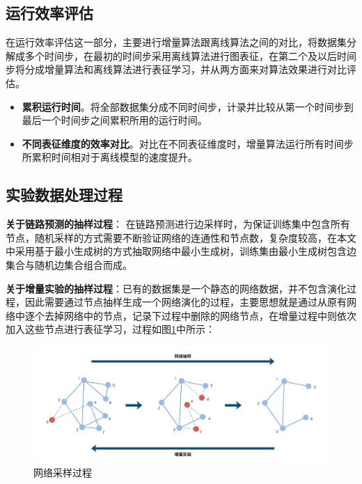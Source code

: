\subsection{运行效率评估}
在运行效率评估这一部分，主要进行增量算法跟离线算法之间的对比，将数据集分解成多个时间步，在最初的时间步采用离线算法进行图表征，在第二个及以后时间步将分成增量算法和离线算法进行表征学习，并从两方面来对算法效果进行对比评估。
\begin{itemize}
	\item \textbf{累积运行时间}。将全部数据集分成不同时间步，计录并比较从第一个时间步到最后一个时间步之间累积所用的运行时间。
	\item \textbf{不同表征维度的效率对比}。对比在不同表征维度时，增量算法运行所有时间步所累积时间相对于离线模型的速度提升。 
\end{itemize}
\subsection{实验数据处理过程}
\textbf{关于链路预测的抽样过程}：
在链路预测进行边采样时，为保证训练集中包含所有节点，随机采样的方式需要不断验证网络的连通性和节点数，复杂度较高，在本文中采用基于最小生成树的方式抽取网络中最小生成树，训练集由最小生成树包含边集合与随机边集合组合而成。

 \textbf{关于增量实验的抽样过程}：已有的数据集是一个静态的网络数据，并不包含演化过程，因此需要通过节点抽样生成一个网络演化的过程，主要思想就是通过从原有网络中逐个去掉网络中的节点，记录下过程中删除的网络节点，在增量过程中则依次加入这些节点进行表征学习，过程如图\ref{fig:network_sample}中所示：
\begin{figure}
	\centering
	\includegraphics[width=6.2in]{figures/inc_sample}
	\caption{网络采样过程}
	\label{fig:network_sample}
\end{figure}


